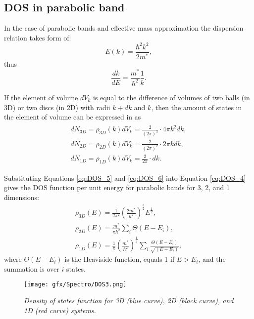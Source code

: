 \documentclass[titlepage,a4paper]{book}
\newcommand{\wciecie}{\quad\phantom{v}}
\begin{document}
\subsection{DOS in parabolic band}
\wciecie
In the case of parabolic bands and effective mass approximation the dispersion relation takes form of:
\begin{equation}
\label{eq:DOS_4}
E(k) = \frac{\hbar^2k^2}{2m^*},
\end{equation}
thus
\begin{equation}
\label{eq:DOS_5}
\frac{dk}{dE} = \frac{m^*}{\hbar^2} \frac{1}{k}.
\end{equation}

If the element of volume $dV_k$ is equal to the difference of volumes of two balls (in 3D) or two discs (in 2D) with radii $k+dk$ and $k$, then the amount of states in the element of volume can be expressed in as  
\begin{eqnarray}
\label{eq:DOS_6}
\begin{aligned}
dN_{3D} = \rho_{3D} (k) dV_k = \frac{2}{(2\pi)^3} \cdot 4\pi k^2 dk,\\
dN_{2D} = \rho_{2D} (k) dV_k = \frac{2}{(2\pi)^2} \cdot 2\pi k dk, \\
dN_{1D} = \rho_{1D} (k) dV_k = \frac{2}{2\pi} \cdot dk.
\end{aligned}
\end{eqnarray}

Substituting Equations \ref{eq:DOS_5} and \ref{eq:DOS_6} into Equation \ref{eq:DOS_4} gives the DOS function per unit energy for parabolic bands for 3, 2, and 1 dimensions:
\begin{eqnarray}
\label{eq:DOS_7}
\rho_{3D}(E) = \frac{1}{2\pi^2} \left(\frac{2m^*}{\hbar^2} \right)^{\frac{3}{2}} E^\frac{1}{2}, \\
\rho_{2D}(E) = \frac{m^*}{\pi\hbar^2}\sum_i \Theta(E-E_i),\\
\rho_{1D}(E) = \frac{1}{\pi}\left(\frac{m^*}{\hbar^2}\right)^{\frac{1}{2}} \sum_i \frac{\Theta(E-E_i)}{\sqrt{(E-E_i)}} ,
\end{eqnarray}
where $\Theta(E-E_i)$ is the Heaviside function, equals 1 if $E > E_i$, and the summation is over $i$ states. 

\begin{figure}[H]
	\centering
	\texttt{[image: gfx/Spectro/DOS3.png]}
	\vspace{-10pt}
	\caption{\textit{Density of states function for 3D (blue curve), 2D (black curve), and 1D (red curve) systems.}}
	\label{fig:DOS3}
\end{figure}
\end{document}
